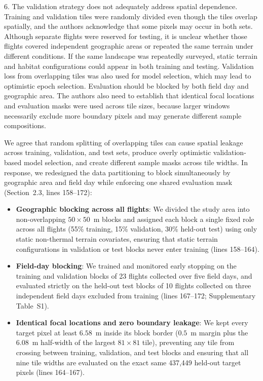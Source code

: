 \documentclass[12pt,english]{reviewresponse}
\begin{document}
\begin{revcomment}
6. The validation strategy does not adequately address spatial dependence. Training and validation tiles were randomly divided even though the tiles overlap spatially, and the authors acknowledge that some pixels may occur in both sets. Although separate flights were reserved for testing, it is unclear whether those flights covered independent geographic areas or repeated the same terrain under different conditions. If the same landscape was repeatedly surveyed, static terrain and habitat configurations could appear in both training and testing. Validation loss from overlapping tiles was also used for model selection, which may lead to optimistic epoch selection. Evaluation should be blocked by both field day and geographic area. The authors also need to establish that identical focal locations and evaluation masks were used across tile sizes, because larger windows necessarily exclude more boundary pixels and may generate different sample compositions.
\end{revcomment}

\begin{revresponse}
We agree that random splitting of overlapping tiles can cause spatial leakage across training, validation, and test sets, produce overly optimistic validation-based model selection, and create different sample masks across tile widths. In response, we redesigned the data partitioning to block simultaneously by geographic area and field day while enforcing one shared evaluation mask (Section~2.3, lines 158--172):
\begin{itemize}[leftmargin=*, itemsep=0.2em]
    \item \textbf{Geographic blocking across all flights}: We divided the study area into non-overlapping $50\times 50$~m blocks and assigned each block a single fixed role across all flights (55\% training, 15\% validation, 30\% held-out test) using only static non-thermal terrain covariates, ensuring that static terrain configurations in validation or test blocks never enter training (lines 158--164).
    \item \textbf{Field-day blocking}: We trained and monitored early stopping on the training and validation blocks of 23 flights collected over five field days, and evaluated strictly on the held-out test blocks of 10 flights collected on three independent field days excluded from training (lines 167--172; Supplementary Table~S1).
    \item \textbf{Identical focal locations and zero boundary leakage}: We kept every target pixel at least $6.58$~m inside its block border ($0.5$~m margin plus the $6.08$~m half-width of the largest $81\times 81$ tile), preventing any tile from crossing between training, validation, and test blocks and ensuring that all nine tile widths are evaluated on the exact same 437,449 held-out target pixels (lines 164--167).
\end{itemize}
\end{revresponse}
\end{document}

